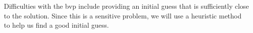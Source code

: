 Difficulties with the bvp include providing an initial guess that is sufficiently close to the solution.  Since this is a sensitive problem, we will use a heuristic method to help us find a good initial guess.








%
%
%









